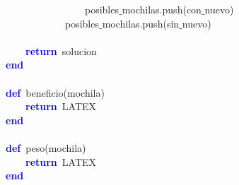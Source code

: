 \mbox{}\ \ \ \ \ \ \ \ \ \ \ \ \ \ \ \ posibles$\_$mochilas\textcolor{BrickRed}{.}push\textcolor{BrickRed}{(}con$\_$nuevo\textcolor{BrickRed}{)} \\
\mbox{}\ \ \ \ \ \ \ \ \ \ \ \ posibles$\_$mochilas\textcolor{BrickRed}{.}push\textcolor{BrickRed}{(}sin$\_$nuevo\textcolor{BrickRed}{)} \\
\mbox{}\ \ \ \ \ \ \ \  \\
\mbox{}\ \ \ \ \textbf{\textcolor{Blue}{return}}\ solucion \\
\mbox{}\textbf{\textcolor{Blue}{end}} \\
\mbox{} \\
\mbox{}\textbf{\textcolor{Blue}{def}}\ beneficio\textcolor{BrickRed}{(}mochila\textcolor{BrickRed}{)} \\
\mbox{}\ \ \ \ \textbf{\textcolor{Blue}{return}}\ LATEX \\
\mbox{}\textbf{\textcolor{Blue}{end}} \\
\mbox{} \\
\mbox{}\textbf{\textcolor{Blue}{def}}\ peso\textcolor{BrickRed}{(}mochila\textcolor{BrickRed}{)} \\
\mbox{}\ \ \ \ \textbf{\textcolor{Blue}{return}}\ LATEX \\
\mbox{}\textbf{\textcolor{Blue}{end}} \\
\mbox{} \\
\mbox{}\ \ \ \ \ \ \ \ \ \ \ \  \\
\mbox{}
